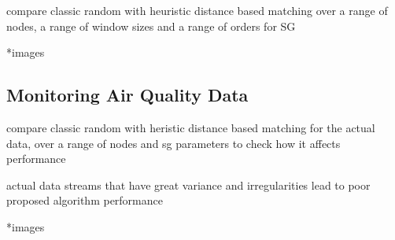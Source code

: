 compare classic random with heuristic distance based matching over a range of nodes, a range of window sizes and a range of orders for SG

*images

\subsection{Monitoring Air Quality Data} \label{subsec:actualComp}

compare classic random with heristic distance based matching for the actual data, over a range of nodes and sg parameters to check how it affects performance

actual data streams that have great variance and irregularities lead to poor proposed algorithm performance

*images
